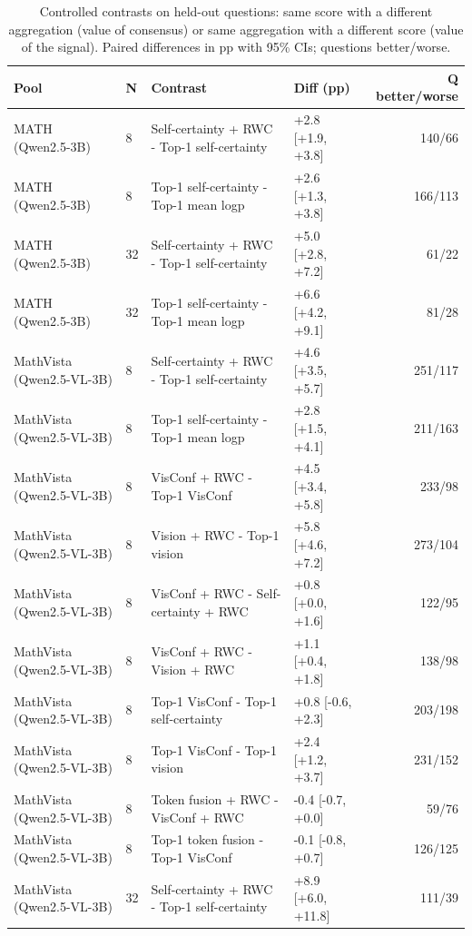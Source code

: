 \begin{table}[t]
\centering
\small
\caption{Controlled contrasts on held-out questions: same score with a different aggregation (value of consensus) or same aggregation with a different score (value of the signal). Paired differences in pp with 95\% CIs; questions better/worse.}
\label{tab:T4_controlled_contrasts}
\begin{tabular}{llllr}
\toprule
Pool & N & Contrast & Diff (pp) & Q better/worse \\
\midrule
MATH (Qwen2.5-3B) & 8 & Self-certainty + RWC - Top-1 self-certainty & +2.8 [+1.9, +3.8] & 140/66 \\
MATH (Qwen2.5-3B) & 8 & Top-1 self-certainty - Top-1 mean logp & +2.6 [+1.3, +3.8] & 166/113 \\
MATH (Qwen2.5-3B) & 32 & Self-certainty + RWC - Top-1 self-certainty & +5.0 [+2.8, +7.2] & 61/22 \\
MATH (Qwen2.5-3B) & 32 & Top-1 self-certainty - Top-1 mean logp & +6.6 [+4.2, +9.1] & 81/28 \\
MathVista (Qwen2.5-VL-3B) & 8 & Self-certainty + RWC - Top-1 self-certainty & +4.6 [+3.5, +5.7] & 251/117 \\
MathVista (Qwen2.5-VL-3B) & 8 & Top-1 self-certainty - Top-1 mean logp & +2.8 [+1.5, +4.1] & 211/163 \\
MathVista (Qwen2.5-VL-3B) & 8 & VisConf + RWC - Top-1 VisConf & +4.5 [+3.4, +5.8] & 233/98 \\
MathVista (Qwen2.5-VL-3B) & 8 & Vision + RWC - Top-1 vision & +5.8 [+4.6, +7.2] & 273/104 \\
MathVista (Qwen2.5-VL-3B) & 8 & VisConf + RWC - Self-certainty + RWC & +0.8 [+0.0, +1.6] & 122/95 \\
MathVista (Qwen2.5-VL-3B) & 8 & VisConf + RWC - Vision + RWC & +1.1 [+0.4, +1.8] & 138/98 \\
MathVista (Qwen2.5-VL-3B) & 8 & Top-1 VisConf - Top-1 self-certainty & +0.8 [-0.6, +2.3] & 203/198 \\
MathVista (Qwen2.5-VL-3B) & 8 & Top-1 VisConf - Top-1 vision & +2.4 [+1.2, +3.7] & 231/152 \\
MathVista (Qwen2.5-VL-3B) & 8 & Token fusion + RWC - VisConf + RWC & -0.4 [-0.7, +0.0] & 59/76 \\
MathVista (Qwen2.5-VL-3B) & 8 & Top-1 token fusion - Top-1 VisConf & -0.1 [-0.8, +0.7] & 126/125 \\
MathVista (Qwen2.5-VL-3B) & 32 & Self-certainty + RWC - Top-1 self-certainty & +8.9 [+6.0, +11.8] & 111/39 \\

\end{tabular}
\end{table}
